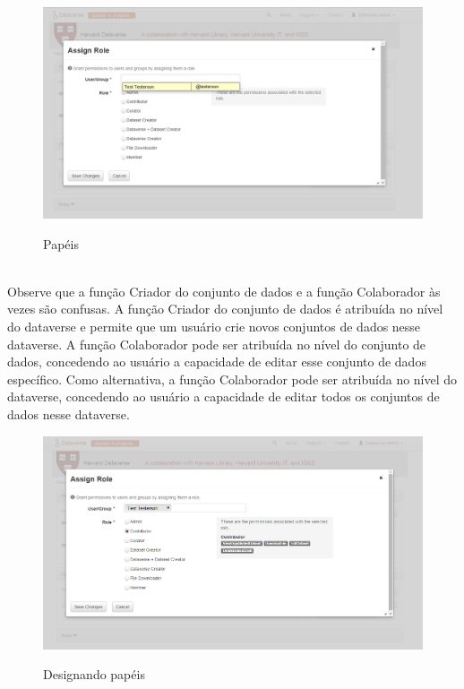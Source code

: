 \documentclass[12pt,hidelinks]{article}
\begin{document}
\begin{figure}[H]
  \caption{Papéis}
        \centering
     \includegraphics[scale=0.4]{prt4.png}
            \label{Acesso 2}
        \end{figure}
\\
        
Observe que a função Criador do conjunto de dados e a função Colaborador às vezes são confusas. A função Criador do conjunto de dados é atribuída no nível do dataverse e permite que um usuário crie novos conjuntos de dados nesse dataverse. A função Colaborador pode ser atribuída no nível do conjunto de dados, concedendo ao usuário a capacidade de editar esse conjunto de dados específico. Como alternativa, a função Colaborador pode ser atribuída no nível do dataverse, concedendo ao usuário a capacidade de editar todos os conjuntos de dados nesse dataverse.

\begin{figure}[H]
 \caption{Designando papéis}
                \centering           \includegraphics[scale=0.4]{prt5.png}
            \label{Acesso 3}
        \end{figure}
\\
\end{document}
